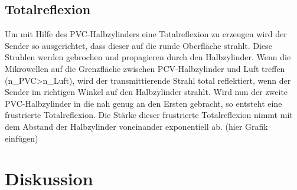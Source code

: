 \subsection{Totalreflexion}
Um mit Hilfe des PVC-Halbzylinders eine Totalreflexion zu erzeugen wird der Sender so ausgerichtet, dass dieser  auf die runde Oberfläche strahlt. Diese Strahlen werden gebrochen und propagieren durch den Halbzylinder.
Wenn die Mikrowellen auf die Grenzfläche zwischen PCV-Halbzylinder und Luft treffen (n_{PVC}>n_{Luft}), wird der transmittierende Strahl total reflektiert, wenn der Sender im richtigen Winkel auf den Halbzylinder strahlt.
Wird nun der zweite PVC-Halbzylinder in die nah genug an den Ersten gebracht, so entsteht eine frustrierte Totalreflexion.
Die Stärke dieser frustrierte Totalreflexion nimmt mit dem Abstand der Halbzylinder voneinander exponentiell ab.
(hier Grafik einfügen)



\newpage
\section{Diskussion} 